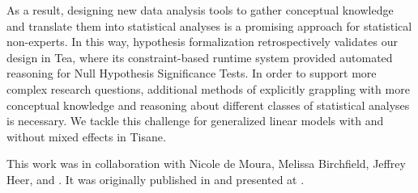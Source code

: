 As a result, designing new data analysis tools to gather conceptual knowledge
and translate them into statistical analyses is a promising approach for
statistical non-experts. In this way, hypothesis formalization retrospectively
validates our design in Tea, where its constraint-based runtime system provided
automated reasoning for Null Hypothesis Significance Tests. In order to support
more complex research questions, additional methods of explicitly grappling with
more conceptual knowledge and reasoning about different classes of statistical
analyses is necessary. We tackle this challenge for generalized linear models
with and without mixed effects in Tisane. 

This work was in collaboration with Nicole de Moura, Melissa Birchfield, Jeffrey
Heer, and \reneJust. It was originally published in  and presented
at . 